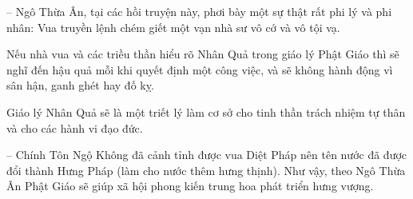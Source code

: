 -- Ngô Thừa Ân, tại các hồi truyện này, phơi bày một sự thật rất phi lý và phi nhân: Vua truyền lệnh chém giết một vạn nhà sư vô cớ và vô tội vạ.

Nếu nhà vua và các triều thần hiểu rõ Nhân Quả trong giáo lý Phật Giáo thì sẽ nghĩ đến hậu quả mỗi khi quyết định một công việc, và sẽ không hành động vì sân hận, ganh ghét hay đố kỵ.

Giáo lý Nhân Quả sẽ là một triết lý làm cơ sở cho tinh thần trách nhiệm tự thân và cho các hành vi đạo đức.

-- Chính Tôn Ngộ Không đã cảnh tỉnh được vua Diệt Pháp nên tên nước đã được đổi thành Hưng Pháp (làm cho nước thêm hưng thịnh). Như vậy, theo Ngô Thừa Ân Phật Giáo sẽ giúp xã hội phong kiến trung hoa phát triển hưng vượng.
